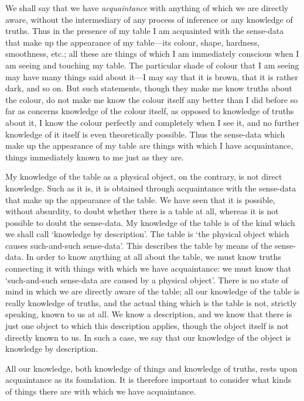 \documentclass[oneside,letterpaper,12pt]{book}
\begin{document}
We shall say that we have \emph{acquaintance} with anything of which we
are directly aware, without the intermediary of any process of inference
or any knowledge of truths. Thus in the presence of my table I am
acquainted with the sense-data that make up the appearance of my
table---its colour, shape, hardness, smoothness, etc.; all these are
things of which I am immediately conscious when I am seeing and touching
my table. The particular shade of colour that I am seeing may have many
things said about it---I may say that it is brown, that it is rather
dark, and so on. But such statements, though they make me know truths
about the colour, do not make me know the colour itself any better than
I did before so far as concerns knowledge of the colour itself, as
opposed to knowledge of truths about it, I know the colour perfectly and
completely when I see it, and no further knowledge of it itself is even
theoretically possible. Thus the sense-data which make up the appearance
of my table are things with which I have acquaintance, things
immediately known to me just as they are.

My knowledge of the table as a physical object, on the contrary, is not
direct knowledge. Such as it is, it is obtained through acquaintance
with the sense-data that make up the appearance of the table. We have
seen that it is possible, without absurdity, to doubt whether there is a
table at all, whereas it is not possible to doubt the sense-data. My
knowledge of the table is of the kind which we shall call
`knowledge by description'. The table is
`the physical object which causes such-and-such
sense-data'. This describes the table by means of the
sense-data. In order to know anything at all about the table, we must
know truths connecting it with things with which we have acquaintance:
we must know that `such-and-such sense-data are caused
by a physical object'. There is no state of mind in which
we are directly aware of the table; all our knowledge of the table is
really knowledge of truths, and the actual thing which is the table is
not, strictly speaking, known to us at all. We know a description, and
we know that there is just one object to which this description applies,
though the object itself is not directly known to us. In such a case, we
say that our knowledge of the object is knowledge by description.

\label{foundationalism} All our knowledge, both knowledge of things and knowledge of truths,
rests upon acquaintance as its foundation. It is therefore important to
consider what kinds of things there are with which we have acquaintance.
\end{document}
